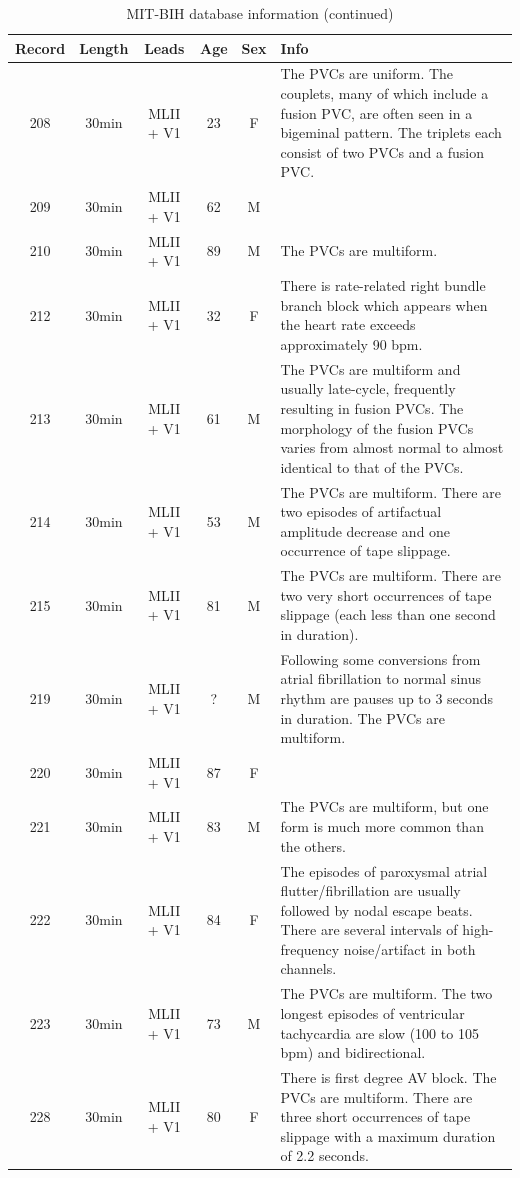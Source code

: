 \documentclass[a4paper,10pt,twoside]{article}
\begin{document}
\begin{table}
\centering
\caption{MIT-BIH database information (continued)}
\label{table:database2}
 \begin{tabular}{c|c|c|c|c|p{14cm}} 
 \hline
 Record & Length & Leads & Age & Sex & Info \\
 \hline
 208 & 30min & MLII + V1 & 23 & F & The PVCs are uniform. The couplets, many of which include a fusion PVC, are often seen in a bigeminal pattern. The triplets each consist of two PVCs and a fusion PVC.\\
 209 & 30min & MLII + V1 & 62 & M & \\
 210 & 30min & MLII + V1 & 89 & M & The PVCs are multiform.\\
 212 & 30min & MLII + V1 & 32 & F & There is rate-related right bundle branch block which appears when the heart rate exceeds approximately 90 bpm.\\
 213 & 30min & MLII + V1 & 61 & M & The PVCs are multiform and usually late-cycle, frequently resulting in fusion PVCs. The morphology of the fusion PVCs varies from almost normal to almost identical to that of the PVCs.\\
 214 & 30min & MLII + V1 & 53 & M & The PVCs are multiform. There are two episodes of artifactual amplitude decrease and one occurrence of tape slippage.\\
 215 & 30min & MLII + V1 & 81 & M & The PVCs are multiform. There are two very short occurrences of tape slippage (each less than one second in duration).\\
 219 & 30min & MLII + V1 & ? & M & Following some conversions from atrial fibrillation to normal sinus rhythm are pauses up to 3 seconds in duration. The PVCs are multiform.\\
 220 & 30min & MLII + V1 & 87 & F & \\
 221 & 30min & MLII + V1 & 83 & M & The PVCs are multiform, but one form is much more common than the others.\\
 222 & 30min & MLII + V1 & 84 & F & The episodes of paroxysmal atrial flutter/fibrillation are usually followed by nodal escape beats. There are several intervals of high-frequency noise/artifact in both channels.\\
 223 & 30min & MLII + V1 & 73 & M & The PVCs are multiform. The two longest episodes of ventricular tachycardia are slow (100 to 105 bpm) and bidirectional.\\
 228 & 30min & MLII + V1 & 80 & F & There is first degree AV block.  The PVCs are multiform. There are three short occurrences of tape slippage with a maximum duration of 2.2 seconds.\\

\end{tabular}
\end{table}
\end{document}
